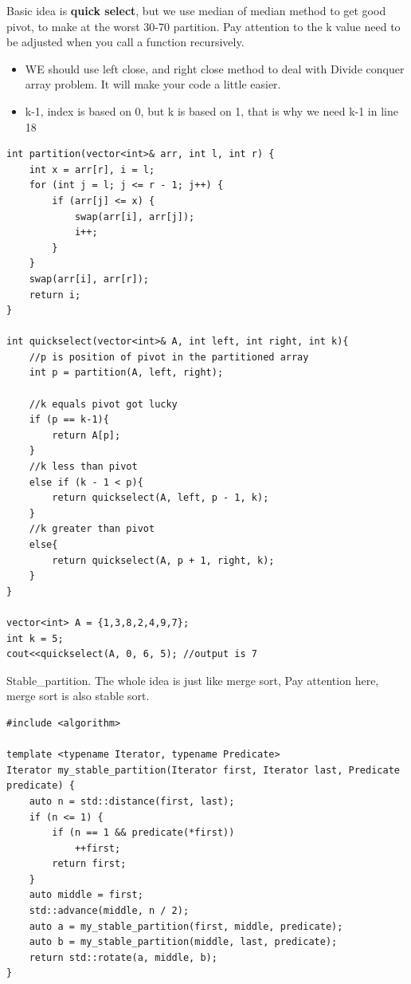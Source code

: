 \documentclass[a4paper,11pt,twoside]{book}
\begin{document}
	\par Basic idea is \textbf{quick select}, but we use median of median method to get good pivot, to make at the worst 30-70 partition. Pay attention to the k value need to be adjusted when you call a function recursively. 
	
\begin{itemize}
	\item WE should use left close, and right close method to deal with Divide conquer array problem. It will make your code a little easier. 
	
	\item k-1, index is based on 0, but k is based on 1, that is why we need k-1 in line 18
\end{itemize}	
	
\begin{lstlisting}
int partition(vector<int>& arr, int l, int r) {
	int x = arr[r], i = l;
	for (int j = l; j <= r - 1; j++) {
		if (arr[j] <= x) {
			swap(arr[i], arr[j]);
			i++;
		}
	}
	swap(arr[i], arr[r]);
	return i;
}

int quickselect(vector<int>& A, int left, int right, int k){
	//p is position of pivot in the partitioned array
	int p = partition(A, left, right);
	
	//k equals pivot got lucky
	if (p == k-1){
		return A[p];
	}
	//k less than pivot
	else if (k - 1 < p){
		return quickselect(A, left, p - 1, k);
	}
	//k greater than pivot
	else{
		return quickselect(A, p + 1, right, k);
	}
}

vector<int> A = {1,3,8,2,4,9,7};
int k = 5;
cout<<quickselect(A, 0, 6, 5); //output is 7
\end{lstlisting}
	
	\par Stable\_partition. The whole idea is just like merge sort, Pay attention here, merge sort is also stable sort. 
\begin{lstlisting}
#include <algorithm>

template <typename Iterator, typename Predicate>
Iterator my_stable_partition(Iterator first, Iterator last, Predicate predicate) {
	auto n = std::distance(first, last);
	if (n <= 1) {
		if (n == 1 && predicate(*first))
			++first;
		return first;
	}
	auto middle = first;
	std::advance(middle, n / 2);
	auto a = my_stable_partition(first, middle, predicate);
	auto b = my_stable_partition(middle, last, predicate);
	return std::rotate(a, middle, b);
}	
\end{lstlisting}
	
\end{document}
